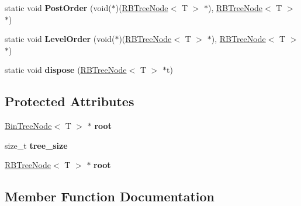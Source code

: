 \begin{DoxyCompactItemize}
\item 
\mbox{\label{classLinkedBinaryTree_a24617bce82a1ee9c5fae10b77aa1700c}} 
static void {\bfseries Post\+Order} (void($\ast$)(\hyperlink{structRBTreeNode}{R\+B\+Tree\+Node}$<$ T $>$ $\ast$), \hyperlink{structRBTreeNode}{R\+B\+Tree\+Node}$<$ T $>$ $\ast$)
\item 
\mbox{\label{classLinkedBinaryTree_a7972c0132471b17a93a812934fb9afec}} 
static void {\bfseries Level\+Order} (void($\ast$)(\hyperlink{structRBTreeNode}{R\+B\+Tree\+Node}$<$ T $>$ $\ast$), \hyperlink{structRBTreeNode}{R\+B\+Tree\+Node}$<$ T $>$ $\ast$)
\item 
\mbox{\label{classLinkedBinaryTree_a769455acc449dc04f9a25c25c7c9d509}} 
static void {\bfseries dispose} (\hyperlink{structRBTreeNode}{R\+B\+Tree\+Node}$<$ T $>$ $\ast$t)
\end{DoxyCompactItemize}
\subsection*{Protected Attributes}
\begin{DoxyCompactItemize}
\item 
\mbox{\label{classLinkedBinaryTree_a58f63c5510916023f4b10eb0c90e4a5a}} 
\hyperlink{structBinTreeNode}{Bin\+Tree\+Node}$<$ T $>$ $\ast$ {\bfseries root}
\item 
\mbox{\label{classLinkedBinaryTree_ae603e8944bd0957a98a15cf1583b6e28}} 
size\+\_\+t {\bfseries tree\+\_\+size}
\item 
\mbox{\label{classLinkedBinaryTree_a858e6cd21a90be28b8c5809d27b84deb}} 
\hyperlink{structRBTreeNode}{R\+B\+Tree\+Node}$<$ T $>$ $\ast$ {\bfseries root}
\end{DoxyCompactItemize}


\subsection{Member Function Documentation}
\mbox{\label{classLinkedBinaryTree_a82b1a5995e90671905da7502d7f58eba}} 
